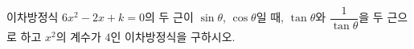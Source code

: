 이차방정식 $6x^{2}-2x+k=0$의 두 근이 $\sin\theta$, $\cos\theta$일 때, $\tan\theta$와 $\dfrac{1}{\tan\theta}$을 두 근으로 하고 $x^{2}$의 계수가 $4$인 이차방정식을 구하시오. 
